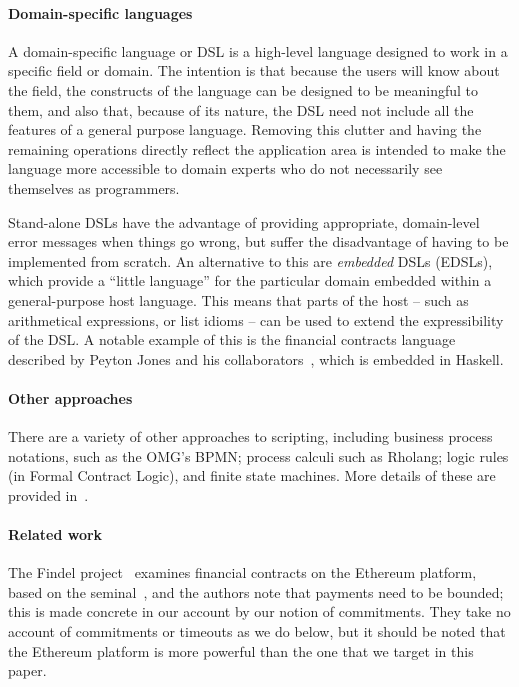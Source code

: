 \documentclass[
      acmsmall
    , screen
    , review=true
  ]{acmart}
\begin{document}
\paragraph{Domain-specific languages} 

A domain-specific language or DSL is a high-level language designed to work in a specific field or domain. The intention 
is that because the users will know about the field, the constructs of the language can be designed to be meaningful to 
them, and also that, because of its nature, the DSL need not include all the features of a general purpose language. 
Removing this clutter and having the remaining operations directly reflect the application area is intended to make the 
language more accessible to domain experts who do not necessarily see themselves as programmers.

Stand-alone DSLs have the advantage of providing appropriate, domain-level error messages when things go wrong, but suffer the disadvantage of having to be implemented from scratch. An alternative to this are \emph{embedded} DSLs (EDSLs), which provide a ``little language'' for the particular domain embedded within a general-purpose host language. This means that parts of the host -- such as arithmetical expressions, or list idioms --  can be used to extend the expressibility of the DSL. A notable example of this is the financial contracts language described by Peyton Jones and his collaborators~\cite{PeytonJones:2000}, which is embedded in Haskell.

\paragraph{Other approaches}

There are a variety of other approaches to scripting, including business process notations, such as the OMG's BPMN; process calculi such as Rholang; logic rules (in Formal Contract Logic), and finite state machines. More details of these are provided in~\cite{cryptoeprint:2016:1156}.

\paragraph{Related work}

The Findel project~\cite{findel} examines financial contracts on the Ethereum platform, based on the seminal~\cite{PeytonJones:2000}, and the authors note that payments need to be bounded; this is made concrete in our account by our notion of commitments. They take no account of commitments or timeouts as we do below, but it should be noted that the Ethereum platform is more powerful than the one that we target in this paper.
\end{document}
